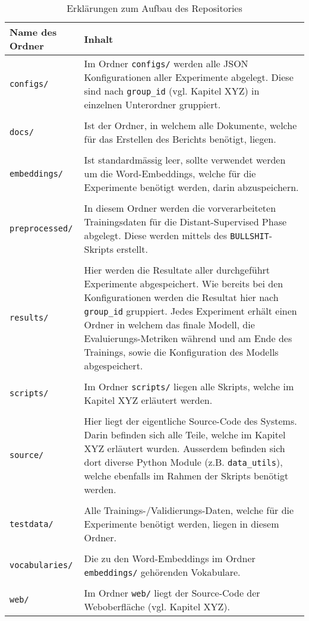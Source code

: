 \begin{appendices}
\begin{table}[H]
  \centering
  \begin{tabularx}{\textwidth}{|l|X|}
    \toprule
    Name des Ordner & Inhalt\\ \midrule
    \texttt{configs/} & Im Ordner \texttt{configs/} werden alle JSON Konfigurationen aller Experimente abgelegt. Diese sind nach \texttt{group{\_}id} (vgl. Kapitel XYZ) in einzelnen Unterordner gruppiert.\\\\
    \texttt{docs/} & Ist der Ordner, in welchem alle Dokumente, welche für das Erstellen des Berichts benötigt, liegen.\\\\
    \texttt{embeddings/} & Ist standardmässig leer, sollte verwendet werden um die Word-Embeddings, welche für die Experimente benötigt werden, darin abzuspeichern.\\\\
    \texttt{preprocessed/} & In diesem Ordner werden die vorverarbeiteten Trainingsdaten für die Distant-Supervised Phase abgelegt. Diese werden mittels des \texttt{BULLSHIT}-Skripts erstellt.\\\\
    \texttt{results/} & Hier werden die Resultate aller durchgeführt Experimente abgespeichert. Wie bereits bei den Konfigurationen werden die Resultat hier nach \texttt{group{\_}id} gruppiert. Jedes Experiment erhält einen Ordner in welchem das finale Modell, die Evaluierungs-Metriken während und am Ende des Trainings, sowie die Konfiguration des Modells abgespeichert.\\\\
    \texttt{scripts/} & Im Ordner \texttt{scripts/} liegen alle Skripts, welche im Kapitel XYZ erläutert werden.\\\\
    \texttt{source/} & Hier liegt der eigentliche Source-Code des Systems. Darin befinden sich alle Teile, welche im Kapitel XYZ erläutert wurden. Ausserdem befinden sich dort diverse Python Module (z.B. \texttt{data{\_}utils}), welche ebenfalls im Rahmen der Skripts benötigt werden.\\\\
    \texttt{testdata/} & Alle Trainings-/Validierungs-Daten, welche für die Experimente benötigt werden, liegen in diesem Ordner.\\\\
    \texttt{vocabularies/} & Die zu den Word-Embeddings im Ordner \texttt{embeddings/} gehörenden Vokabulare.\\\\
    \texttt{web/} & Im Ordner \texttt{web/} liegt der Source-Code der Weboberfläche (vgl. Kapitel XYZ).\\
    \bottomrule
  \end{tabularx}
  \caption{Erklärungen zum Aufbau des Repositories}
\end{table}


\end{appendices}
